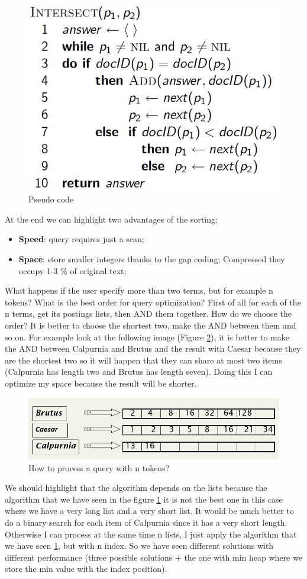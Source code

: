 \begin{figure}
    \centering
    \includegraphics[width=0.75\linewidth]{images/intersectpseudo.png}
    \caption{Pseudo code}
    \label{fig:pseudocode1}
\end{figure}
At the end we can highlight two advantages of the sorting:
\begin{itemize}
    \item \textbf{Speed}: query requires just a scan;
    \item \textbf{Space}: store smaller integers thanks to the gap coding; Compressed they occupy 1-3 \% of original text;
\end{itemize}
What happens if the user specify more than two terms, but for example n tokens? What is the best order for query optimization? First of all for each of the n terms, get its postings lists, then AND them together. How do we choose the order? It is better to choose the shortest two, make the AND between them and so on.
For example look at the following image (Figure \ref{fig:optimization}), it is better to make the AND between Calpurnia and Brutus and the result with Caesar because they are the shortest two so it will happen that they can share at most two items (Calpurnia has length two and Brutus has length seven). Doing this I can optimize my space because the result will be shorter.
\begin{figure}
    \centering
    \includegraphics[width=0.75\linewidth]{images/optimization.png}
    \caption{How to process a query with n tokens?}
    \label{fig:optimization}
\end{figure}
We should highlight that the algorithm depends on the lists because the algorithm that we have seen in the figure \ref{fig:pseudocode1} it is not the best one in this case where we have a very long list and a very short list. It would be much better to do a binary search for each item of Calpurnia since it has a very short length. Otherwise I can process at the same time n lists, I just apply the algorithm that we have seen \ref{fig:pseudocode1}, but with n index. So we have seen different solutions with different performance (three possible solutions + the one with min heap where we store the min value with the index position).
